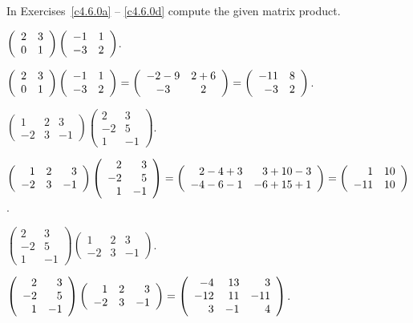 \documentclass{ximera}
\begin{document}
\noindent In Exercises~\ref{c4.6.0a} -- \ref{c4.6.0d} compute
the given matrix product.
\begin{exercise}  \label{c4.6.0a}
$\left(\begin{array}{rr} 2 & 3\\ 0 &1\end{array}\right)\left(\begin{array}{rr} -1 & 1\\ -3 &2\end{array}\right)$.

\begin{solution}
\soln
$\left(\begin{array}{rr} 2 & 3\\ 0 &1\end{array}\right)\left(\begin{array}{rr} -1 & 1\\ -3 &2\end{array}\right) =
\left(\begin{array}{cc} -2 - 9 & 2+6\\ -3 &2\end{array}\right) = \left(\begin{array}{rr} -11 & 8\\ -3 &2\end{array}\right)$.
\end{solution}

\end{exercise}
\begin{exercise}  \label{c4.6.0b}
$\left(\begin{array}{rrr} 1 & 2 & 3\\ -2 & 3 & -1 \end{array}\right)
\left(\begin{array}{rr} 2 & 3\\ -2 & 5 \\1 & -1 \end{array}\right)$.

\begin{solution}
\soln 
$\left(\begin{array}{rrr} 1 & 2 & 3\\ -2 & 3 & -1 \end{array}\right)
\left(\begin{array}{rr} 2 & 3\\ -2 & 5 \\1 & -1 \end{array}\right)
= \left(\begin{array}{rr} 2 - 4 + 3 & 3 + 10 - 3\\ -4 - 6 - 1 &-6 + 15 + 1\end{array}\right)
= \left(\begin{array}{rr} 1 & 10\\ -11 &10\end{array}\right)$.
\end{solution}
\end{exercise}

\begin{exercise}  \label{c4.6.0c}
$\left(\begin{array}{rr} 2 & 3\\ -2 & 5 \\1 & -1 \end{array}\right)
\left(\begin{array}{rrr} 1 & 2 & 3\\ -2 & 3 & -1 \end{array}\right)$.

\begin{solution}
\soln
$\left(\begin{array}{rr} 2 & 3\\ -2 & 5 \\1 & -1 \end{array}
\right) \left(\begin{array}{rrr} 1 & 2 & 3\\ -2 & 3 & -1 \end{array}\right)
= \left(\begin{array}{rrr} -4 & 13 & 3 \\ -12 & 11 & -11 \\ 3 & -1 & 4\end{array}\right)$.
\end{solution}
\end{exercise}
\end{document}
